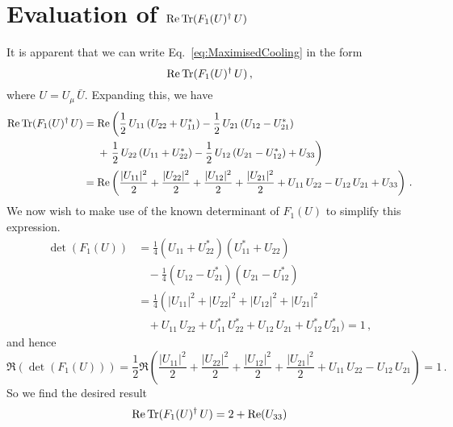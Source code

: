 \chapter{Evaluation of $\operatorname{Re}\operatorname{Tr}(F_1(U)^\dagger \,U)$}\label{app:CoolingMaximise}

It is apparent that we can write Eq.~\ref{eq:MaximisedCooling} in the form
\begin{equation}
\operatorname{Re}\operatorname{Tr}(F_1(U)^\dagger\, U)\, ,
\end{equation}
where $U = U_\mu\, \bar{U}$. Expanding this, we have
\begin{align*}
\operatorname{Re}\operatorname{Tr}(F_1(U)^\dagger\, U) &=\operatorname{Re} \left( \frac{1}{2}\,U_{11} \left(U_{22} + U_{11}^*\right) - \frac{1}{2}\,U_{21} \left(U_{12} - U_{21}^*\right)\right.\\
&~~~~+ \left. \frac{1}{2}\,U_{22} \left(U_{11} + U_{22}^*\right)
- \frac{1}{2}\,U_{12} \left(U_{21} - U_{12}^*\right) +U_{33}\right)\\
&= \operatorname{Re}\left(\frac{|U_{11}|^2}{2} + \frac{|U_{22}|^2}{2} + \frac{|U_{12}|^2}{2} + \frac{|U_{21}|^2}{2} + U_{11}\,U_{22} - U_{12}\,U_{21} + U_{33}\right)\, .
\end{align*}
We now wish to make use of the known determinant of $F_1(U)$ to simplify this expression.
\begin{align*}
\det(F_1(U)) &= \frac{1}{4} \left(U_{11}+ U_{22}^*\right)\left(U_{11}^* + U_{22}\right)\\
&~~~~-\frac{1}{4}\left(U_{12} - U_{21}^*\right)\left( U_{21} - U_{12}^*\right)\\
&=\frac{1}{4}\left( |U_{11}|^2 + |U_{22}|^2 + |U_{12}|^2 + |U_{21}|^2\right.\\
&~~~~+ U_{11}\,U_{22} + U_{11}^*\,U_{22}^* + U_{12}\,U_{21} + U_{12}^*\,U_{21}^*\big) = 1\, ,
\end{align*}
and hence
\begin{equation}
\Re(\det(F_1(U))) = \frac{1}{2}\Re\left(\frac{|U_{11}|^2}{2} + \frac{|U_{22}|^2}{2} + \frac{|U_{12}|^2}{2} + \frac{|U_{21}|^2}{2} + U_{11}\,U_{22} - U_{12}\,U_{21}\right) = 1\, .
\end{equation}
So we find the desired result
\begin{equation}
\operatorname{Re}\operatorname{Tr}(F_1(U)^\dagger\, U) = 2 + \operatorname{Re}(U_{33})
\end{equation}